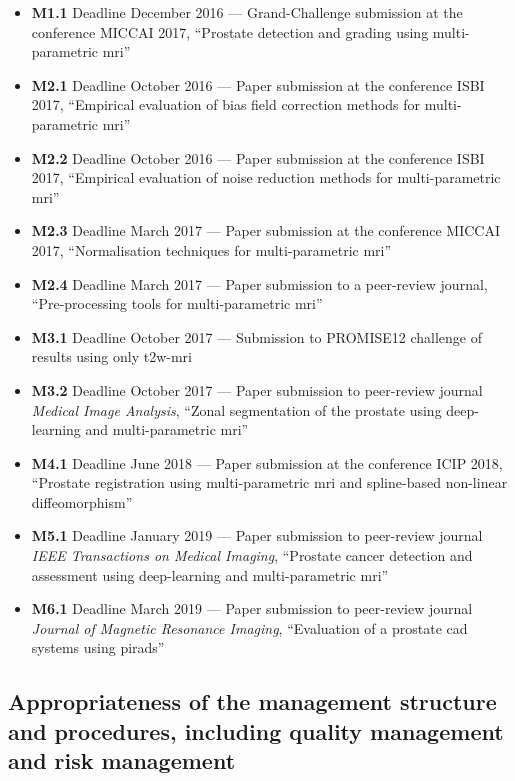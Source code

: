 \begin{itemize}[noitemsep]
\item[] \textbf{M1.1} Deadline December 2016 --- Grand-Challenge submission at the conference MICCAI 2017, ``Prostate detection and grading using multi-parametric \ac{mri}''
\item[] \textbf{M2.1} Deadline October 2016 --- Paper submission at the conference ISBI 2017, ``Empirical evaluation of bias field correction methods for multi-parametric \ac{mri}''
\item[] \textbf{M2.2} Deadline October 2016 --- Paper submission at the conference ISBI 2017, ``Empirical evaluation of noise reduction methods for multi-parametric \ac{mri}''
\item[] \textbf{M2.3} Deadline March 2017 --- Paper submission at the conference MICCAI 2017, ``Normalisation techniques for multi-parametric \ac{mri}''
\item[] \textbf{M2.4} Deadline March 2017 --- Paper submission to a peer-review journal, ``Pre-processing tools for multi-parametric \ac{mri}''
\item[] \textbf{M3.1} Deadline October 2017 --- Submission to PROMISE12 challenge of results using only \ac{t2w}-\ac{mri}
\item[] \textbf{M3.2} Deadline October 2017 --- Paper submission to peer-review journal \emph{Medical Image Analysis}, ``Zonal segmentation of the prostate using deep-learning and multi-parametric \ac{mri}''
\item[] \textbf{M4.1} Deadline June 2018 --- Paper submission at the conference ICIP 2018, ``Prostate registration using multi-parametric \ac{mri} and spline-based non-linear diffeomorphism''
\item[] \textbf{M5.1} Deadline January 2019 --- Paper submission to peer-review journal \emph{IEEE Transactions on Medical Imaging}, ``Prostate cancer detection and assessment using deep-learning and multi-parametric \ac{mri}''
\item[] \textbf{M6.1} Deadline March 2019 --- Paper submission to peer-review journal \emph{Journal of Magnetic Resonance Imaging}, ``Evaluation of a prostate \ac{cad} systems using \ac{pirads}''
\end{itemize}

\subsection{Appropriateness of the management structure and procedures, including quality management and risk management}

